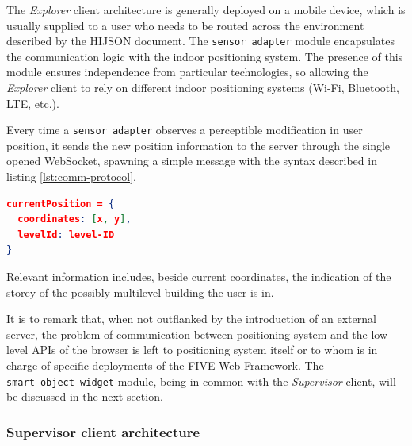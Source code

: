 The \emph{Explorer} client architecture is generally deployed on a mobile
device, which is usually supplied to a user who needs to be routed across the
environment described by the HIJSON document. The {\tt sensor\ adapter} module
encapsulates the communication logic with the indoor positioning system. The
presence of this module ensures independence from particular technologies, so
allowing the \emph{Explorer} client to rely on different indoor positioning
systems (Wi-Fi, Bluetooth, LTE, etc.).

Every time a {\tt sensor\ adapter} observes a perceptible
modification in user position, it sends the new position information to the
server through the single opened WebSocket, spawning a simple message with the
syntax described in listing \ref{lst:comm-protocol}.

\begin{lstlisting}[language=json, label={lst:comm-protocol}, captionpos=b,  caption=Example of message sent by the \emph{Explorer} client to the server.]
currentPosition = {
  coordinates: [x, y],
  levelId: level-ID 
}
\end{lstlisting}

Relevant information includes, beside current coordinates, the indication of
the storey of the possibly multilevel building the user is in.

It is to remark that, when not outflanked by the introduction of an external
server, the problem of communication between positioning system and the low
level APIs of the browser is left to positioning system itself or to whom is
in charge of specific deployments of the FIVE Web Framework.
The \texttt{smart\ object\ widget} module, being in common with the
 \emph{Supervisor} client, will be discussed in the next section.

\subsubsection{Supervisor client architecture}\label{supervisor-client-architecture}

